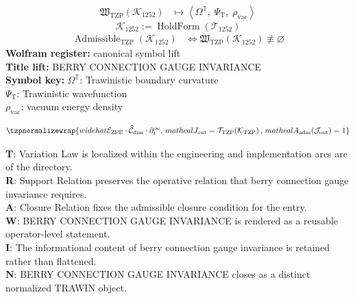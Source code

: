 \noindent
\begin{minipage}[t]{0.48\linewidth}
\begingroup
\small
\[
\begin{aligned}
\mathfrak{W}_{\mathrm{TZP}}\!\left(\mathcal{K}_{1252}\right)
&\longmapsto
\left\langle \Omega^{\mathbb{T}},\; \Psi_{\mathrm{T}},\; \rho_{\mathrm{vac}} \right\rangle
\end{aligned}
\]
\[
\mathcal{K}_{1252}
:=
\operatorname{HoldForm}\!\left(\mathcal{T}_{1252}\right)
\]
\[
\begin{aligned}
\operatorname{Admissible}_{\mathrm{TZP}}\!\left(\mathcal{K}_{1252}\right)
&\Longleftrightarrow
\mathfrak{W}_{\mathrm{TZP}}\!\left(\mathcal{K}_{1252}\right)\not\equiv\varnothing
\end{aligned}
\]
\textbf{Wolfram register:} canonical symbol lift\\
\textbf{Title lift:} BERRY CONNECTION GAUGE INVARIANCE\\
\textbf{Symbol key:} \(\Omega^{\mathbb{T}}\): Trawinistic boundary curvature\\ \(\Psi_{\mathrm{T}}\): Trawinistic wavefunction\\ \(\rho_{\mathrm{vac}}\): vacuum energy density
\par
\endgroup
\end{minipage}\hfill
\begin{minipage}[t]{0.48\linewidth}
\[
\tzpnormalizewrap{widehat{\mathcal{E}}_{\mathrm{ZPE}} \cdot \widehat{\mathcal{C}}_{\mathrm{dim}} \cdot \partial_{t}^{\infty},\,mathcal{J}_{\mathrm{out}} = \mathcal{T}_{\mathrm{TZP}}\!\left(\mathcal{K}_{\mathrm{TZP}}\right),\,mathcal{A}_{\mathrm{adm}}\!\left(\mathcal{J}_{\mathrm{out}}\right)=1}
\]

\small
\textbf{T}: Variation Law is localized within the engineering and implementation arcs arc of the directory.\\
\textbf{R}: Support Relation preserves the operative relation that berry connection gauge invariance requires.\\
\textbf{A}: Closure Relation fixes the admissible closure condition for the entry.\\
\textbf{W}: BERRY CONNECTION GAUGE INVARIANCE is rendered as a reusable operator-level statement.\\
\textbf{I}: The informational content of berry connection gauge invariance is retained rather than flattened.\\
\textbf{N}: BERRY CONNECTION GAUGE INVARIANCE closes as a distinct normalized TRAWIN object.
\normalsize
\end{minipage}

